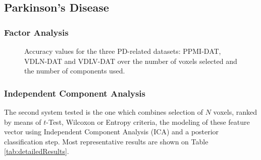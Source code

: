 	\subsection{Parkinson's Disease}
	
	\subsubsection{Factor Analysis}
	
	\begin{figure}
		\myfloatalign
		
		\caption{Accuracy values for the three \ac{PD}-related datasets: PPMI-DAT, VDLN-DAT and VDLV-DAT over \protect{} the number of voxels selected and \protect{} the number of components used.} 
		\label{fig:accFAttest}
	\end{figure}
	
	\subsubsection{Independent Component Analysis}
	The second system tested is the one which combines selection of $N$ voxels, ranked by means of $t$-Test, Wilcoxon or Entropy criteria, the modeling of these feature vector using Independent Component Analysis (ICA) and a posterior classification step. Most representative results are shown on Table \ref{tab:detailedResults}.
	
